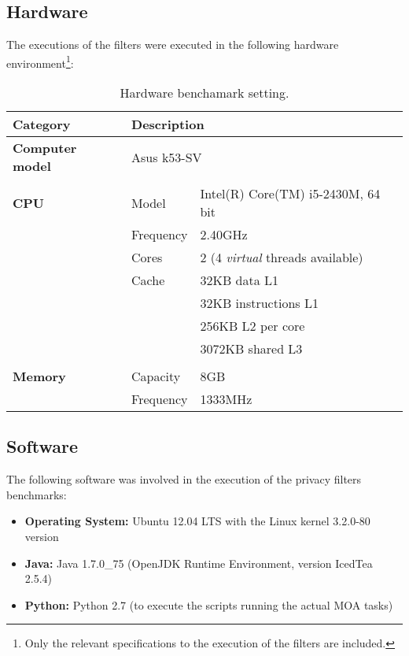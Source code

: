 \subsection{Hardware}
\label{Benchmarking:Experimental:Hardware}

The executions of the filters were executed in the following hardware environment\footnote{Only the relevant specifications to the execution of the filters are included.}:

\begin{table}[H]
	\centering
	\begin{tabular}{@{}lll@{}}
		\toprule
		\textbf{Category} & \multicolumn{2}{l}{\textbf{Description}} \\ \midrule
		
		\textbf{Computer model} & \multicolumn{2}{l}{Asus k53-SV} \\
		&&\\
		\textbf{CPU} & Model & Intel(R) Core(TM) i5-2430M, 64 bit \\
		             & Frequency & 2.40GHz \\
		             & Cores & 2 (4 \textit{virtual} threads available) \\
		             & Cache & 32KB data L1 \\
		             &       & 32KB instructions L1 \\
		             &       & 256KB L2 per core \\
		             &       & 3072KB shared L3 \\
		&&\\
		\textbf{Memory} & Capacity & 8GB \\
		                & Frequency & 1333MHz \\
		\bottomrule
	\end{tabular}
	\caption[Hardware benchamark setting.]{Hardware benchamark setting.}
	\label{table:execution-hardware}
\end{table}

\subsection{Software}
\label{Benchmarking:Experimental:Software}

The following software was involved in the execution of the privacy filters benchmarks:

\begin{itemize}
\item \textbf{Operating System:} Ubuntu 12.04 LTS with the Linux kernel 3.2.0-80 version
\item \textbf{Java:} Java 1.7.0\_75 (OpenJDK Runtime Environment, version IcedTea 2.5.4)
\item \textbf{Python:} Python 2.7 (to execute the scripts running the actual MOA tasks)
\end{itemize}